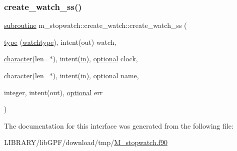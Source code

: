 \subsubsection{\texorpdfstring{create\+\_\+watch\+\_\+ss()}{create\_watch\_ss()}}
{\footnotesize\ttfamily \hyperlink{M__stopwatch_83_8txt_acfbcff50169d691ff02d4a123ed70482}{subroutine} m\+\_\+stopwatch\+::create\+\_\+watch\+::create\+\_\+watch\+\_\+ss (\begin{DoxyParamCaption}\item[{\hyperlink{stop__watch_83_8txt_a70f0ead91c32e25323c03265aa302c1c}{type} (\hyperlink{structm__stopwatch_1_1watchtype}{watchtype}), intent(out)}]{watch,  }\item[{\hyperlink{option__stopwatch_83_8txt_abd4b21fbbd175834027b5224bfe97e66}{character}(len=$\ast$), intent(\hyperlink{M__journal_83_8txt_afce72651d1eed785a2132bee863b2f38}{in}), \hyperlink{option__stopwatch_83_8txt_aa4ece75e7acf58a4843f70fe18c3ade5}{optional}}]{clock,  }\item[{\hyperlink{option__stopwatch_83_8txt_abd4b21fbbd175834027b5224bfe97e66}{character}(len=$\ast$), intent(\hyperlink{M__journal_83_8txt_afce72651d1eed785a2132bee863b2f38}{in}), \hyperlink{option__stopwatch_83_8txt_aa4ece75e7acf58a4843f70fe18c3ade5}{optional}}]{name,  }\item[{integer, intent(out), \hyperlink{option__stopwatch_83_8txt_aa4ece75e7acf58a4843f70fe18c3ade5}{optional}}]{err }\end{DoxyParamCaption})\hspace{0.3cm}{\ttfamily [private]}}



The documentation for this interface was generated from the following file\+:\begin{DoxyCompactItemize}
\item 
L\+I\+B\+R\+A\+R\+Y/lib\+G\+P\+F/download/tmp/\hyperlink{M__stopwatch_8f90}{M\+\_\+stopwatch.\+f90}\end{DoxyCompactItemize}
